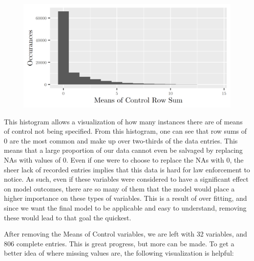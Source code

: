 \documentclass{article} %
\begin{document}
	\begin{figure}[H]
		\includegraphics[width = \textwidth]{MeansOfControlSumHist}
	\end{figure}
	
	This histogram allows a visualization of how many instances there are of means of control not being specified. From this histogram, one can see that row sums of 0 are the most common and make up over two-thirds of the data entries. This means that a large proportion of our data cannot even be salvaged by replacing NAs with values of 0. Even if one were to choose to replace the NAs with 0, the sheer lack of recorded entries implies that this data is hard for law enforcement to notice. As such, even if these variables were considered to have a significant effect on model outcomes, there are so many of them that the model would place a higher importance on these types of variables. This is a result of over fitting, and since we want the final model to be applicable and easy to understand, removing these would lead to that goal the quickest.
	
	After removing the Means of Control variables, we are left with 32 variables, and 806 complete entries. This is great progress, but more can be made. To get a better idea of where missing values are, the following visualization is helpful:
	
\end{document}
